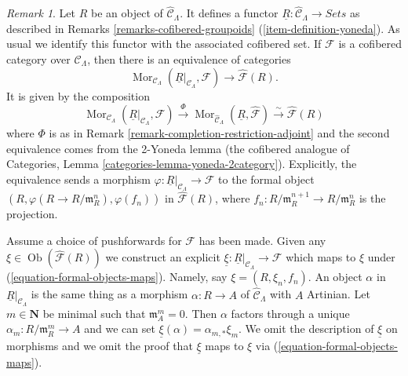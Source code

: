 \documentclass{stacks-project}
\theoremstyle{plain}
\theoremstyle{definition}
\theoremstyle{remark}
\newtheorem{remark}[subsection]{Remark}
\numberwithin{equation}{subsection}
\def\Mor{\mathop{\mathrm{Mor}}\nolimits}
\def\Ob{\mathop{\mathrm{Ob}}\nolimits}
\begin{document}
\begin{remark}
\label{remark-formal-objects-yoneda}
Let $R$ be an object of $\widehat{\mathcal{C}}_\Lambda$.  It defines a functor
$\underline{R}: \widehat{\mathcal{C}}_\Lambda \to \textit{Sets}$
as described in
Remarks \ref{remarks-cofibered-groupoids} (\ref{item-definition-yoneda}).
As usual we identify this functor with the
associated cofibered set.  If $\mathcal{F}$ is a cofibered category over
$\mathcal{C}_\Lambda$, then there is an equivalence of categories
\begin{equation}
\label{equation-formal-objects-maps}
\Mor_{\mathcal{C}_\Lambda}(
\underline{R}|_{\mathcal{C}_\Lambda}, \mathcal{F})
\longrightarrow
\widehat{\mathcal{F}}(R).
\end{equation}
It is given by the composition
$$
\Mor_{\mathcal{C}_\Lambda}(
\underline{R}|_{\mathcal{C}_\Lambda}, \mathcal{F})
\xrightarrow{\Phi}
\Mor_{\widehat{\mathcal{C}}_\Lambda}(
\underline{R}, \widehat{\mathcal{F}})
\xrightarrow{\sim}
\widehat{\mathcal{F}}(R)
$$
where $\Phi$ is as in
Remark \ref{remark-completion-restriction-adjoint}
and the second equivalence comes from the 2-Yoneda lemma
(the cofibered analogue of
Categories, Lemma \ref{categories-lemma-yoneda-2category}).
Explicitly, the equivalence sends a morphism
$\varphi : \underline{R}|_{\mathcal{C}_\Lambda} \to \mathcal{F}$
to the formal object
$(R, \varphi(R \to R/\mathfrak{m}_R^n), \varphi(f_n))$ in
$\widehat{\mathcal{F}}(R)$, where
$f_n : R/\mathfrak m_R^{n + 1} \to R/\mathfrak m_R^n$ is the projection.

\medskip\noindent
Assume a choice of pushforwards for $\mathcal{F}$ has been made.
Given any $\xi \in \Ob(\widehat{\mathcal{F}}(R))$ we construct
an explicit
$\underline{\xi} : \underline{R}|_{\mathcal{C}_\Lambda} \to \mathcal{F}$
which maps to $\xi$ under (\ref{equation-formal-objects-maps}).
Namely, say $\xi = (R, \xi_n, f_n)$. An object $\alpha$ in
$\underline{R}|_{\mathcal{C}_\Lambda}$ is the same thing as a morphism
$\alpha : R \to A$ of $\widehat{\mathcal{C}}_\Lambda$ with $A$
Artinian. Let $m \in \mathbf{N}$ be minimal such that $\mathfrak m_A^m = 0$.
Then $\alpha$ factors through a unique $\alpha_m : R/\mathfrak m_R^m \to A$
and we can set $\underline{\xi}(\alpha) = \alpha_{m, *}\xi_m$.
We omit the description of $\underline{\xi}$ on morphisms and we
omit the proof that $\underline{\xi}$ maps to $\xi$
via (\ref{equation-formal-objects-maps}).


\end{remark}
\end{document}

